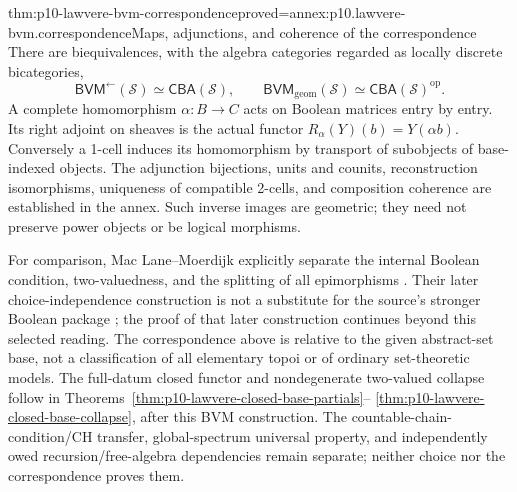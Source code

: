 \begin{hbtheorem}{thm:p10-lawvere-bvm-correspondence}{proved=annex:p10.lawvere-bvm.correspondence}{Maps, adjunctions, and coherence of the correspondence}
There are biequivalences, with the algebra categories regarded as locally
discrete bicategories,
\[
 \mathsf{BVM}^{\leftarrow}(\mathcal S)
       \simeq\mathsf{CBA}(\mathcal S),\qquad
 \mathsf{BVM}_{\mathrm{geom}}(\mathcal S)
       \simeq\mathsf{CBA}(\mathcal S)^{\mathrm{op}}.
\]
A complete homomorphism \(\alpha:B\to C\) acts on Boolean matrices
entry by entry. Its right adjoint on sheaves is the actual functor
\(R_\alpha(Y)(b)=Y(\alpha b)\). Conversely a 1-cell induces its
homomorphism by transport of subobjects of base-indexed objects.
The adjunction bijections, units and counits, reconstruction isomorphisms,
uniqueness of compatible 2-cells, and composition coherence are established
in the annex. Such inverse images are geometric; they need not preserve
power objects or be logical morphisms.
\end{hbtheorem}

For comparison, Mac Lane--Moerdijk explicitly separate the internal
Boolean condition, two-valuedness, and the splitting of all epimorphisms
\cite[pp.~270--276]{MacLaneMoerdijk1992}. Their later choice-independence
construction is not a substitute for the source's stronger Boolean
package \cite[pp.~291--295]{MacLaneMoerdijk1992}; the proof of that later
construction continues beyond this selected reading. The correspondence
above is relative to the given abstract-set base, not a classification
of all elementary topoi or of ordinary set-theoretic models.
The full-datum closed functor and nondegenerate two-valued collapse
follow in Theorems~\ref{thm:p10-lawvere-closed-base-partials}--
\ref{thm:p10-lawvere-closed-base-collapse}, after this BVM construction.
The countable-chain-condition/CH transfer, global-spectrum universal
property, and independently owed recursion/free-algebra dependencies
remain separate; neither choice nor the correspondence proves them.
